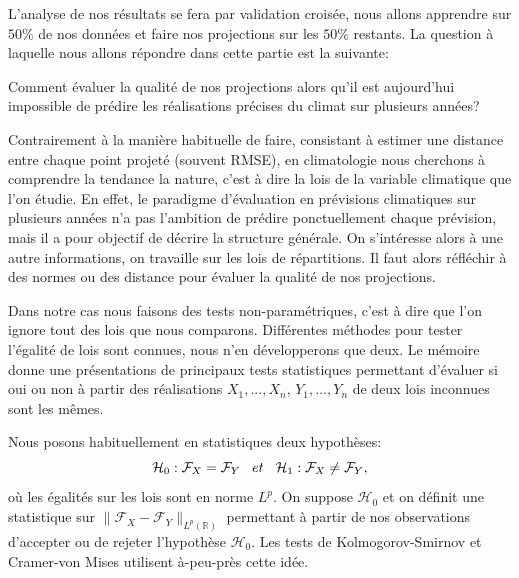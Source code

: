 \documentclass[a4paper,11pt]{article}
\numberwithin{equation}{section}
\begin{document}
L'analyse de nos résultats se fera par validation croisée, nous allons apprendre sur $50\%$ de nos données et faire nos projections sur les $50\%$ restants. La question à laquelle nous allons répondre dans cette partie est la suivante:

Comment évaluer la qualité de nos projections alors qu'il est aujourd'hui impossible de prédire les réalisations précises du climat sur plusieurs années?

Contrairement à la manière habituelle de faire, consistant à estimer une distance entre chaque point projeté (souvent RMSE), en climatologie nous cherchons à comprendre la tendance la nature, c'est à dire la lois de la variable climatique que l'on étudie. En effet, le paradigme d'évaluation en prévisions climatiques sur plusieurs années n'a pas l'ambition de prédire ponctuellement chaque prévision, mais il a pour objectif de décrire la structure générale. On s'intéresse alors à une autre informations, on travaille sur les lois de répartitions. Il faut alors réfléchir à des normes ou des distance pour évaluer la qualité de nos projections.  

\vspace{0.7cm}

Dans notre cas nous faisons des tests non-paramétriques, c'est à dire que l'on ignore tout des lois que nous comparons.
Différentes méthodes pour tester l'égalité de lois sont connues, nous n'en développerons que deux. Le mémoire \cite{ethier2011propos} donne une présentations de principaux tests statistiques permettant d'évaluer si oui ou non à partir des réalisations $X_1,...,X_n$, $Y_1,...,Y_n$ de deux lois inconnues sont les mêmes. 

Nous posons habituellement en statistiques deux hypothèses:
\[ \mathcal{H}_0: \mathcal{F}_{X} = \mathcal{F}_{Y} \hspace{3mm} et \hspace{3mm} \mathcal{H}_1: \mathcal{F}_{X} \neq \mathcal{F}_{Y},\]
où les égalités sur les lois sont en norme $L^p$. On suppose $\mathcal{H}_0$ et on définit une statistique sur $\|\mathcal{F}_{X}-\mathcal{F}_{Y}\|_{L^p(\mathbb{R})}$ permettant à partir de nos observations d'accepter ou de rejeter l'hypothèse $\mathcal{H}_0$.
Les tests de Kolmogorov-Smirnov et Cramer-von Mises utilisent à-peu-près cette idée. 
\end{document}
